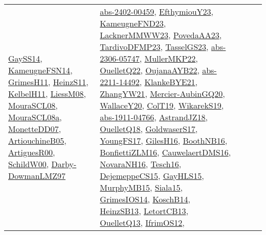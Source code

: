 {\begin{longtable}{lp{3cm}>{\raggedright}p{6cm}>{\raggedright}p{6cm}p{8cm}}
\href{papers/GaySS14.pdf}{GaySS14}\cite{GaySS14}, \href{articles/KameugneFSN14.pdf}{KameugneFSN14}\cite{KameugneFSN14}, \href{papers/GrimesH11.pdf}{GrimesH11}\cite{GrimesH11}, \href{papers/HeinzS11.pdf}{HeinzS11}\cite{HeinzS11}, \href{articles/KelbelH11.pdf}{KelbelH11}\cite{KelbelH11}, \href{articles/LiessM08.pdf}{LiessM08}\cite{LiessM08}, \href{papers/MouraSCL08.pdf}{MouraSCL08}\cite{MouraSCL08}, \href{papers/MouraSCL08a.pdf}{MouraSCL08a}\cite{MouraSCL08a}, \href{papers/MonetteDD07.pdf}{MonetteDD07}\cite{MonetteDD07}, \href{papers/ArtiouchineB05.pdf}{ArtiouchineB05}\cite{ArtiouchineB05}, \href{articles/ArtiguesR00.pdf}{ArtiguesR00}\cite{ArtiguesR00}, \href{articles/SchildW00.pdf}{SchildW00}\cite{SchildW00}, \href{articles/Darby-DowmanLMZ97.pdf}{Darby-DowmanLMZ97}\cite{Darby-DowmanLMZ97} & \href{articles/abs-2402-00459.pdf}{abs-2402-00459}\cite{abs-2402-00459}, \href{papers/EfthymiouY23.pdf}{EfthymiouY23}\cite{EfthymiouY23}, \href{papers/KameugneFND23.pdf}{KameugneFND23}\cite{KameugneFND23}, \href{articles/LacknerMMWW23.pdf}{LacknerMMWW23}\cite{LacknerMMWW23}, \href{papers/PovedaAA23.pdf}{PovedaAA23}\cite{PovedaAA23}, \href{papers/TardivoDFMP23.pdf}{TardivoDFMP23}\cite{TardivoDFMP23}, \href{papers/TasselGS23.pdf}{TasselGS23}\cite{TasselGS23}, \href{articles/abs-2306-05747.pdf}{abs-2306-05747}\cite{abs-2306-05747}, \href{articles/MullerMKP22.pdf}{MullerMKP22}\cite{MullerMKP22}, \href{papers/OuelletQ22.pdf}{OuelletQ22}\cite{OuelletQ22}, \href{papers/OujanaAYB22.pdf}{OujanaAYB22}\cite{OujanaAYB22}, \href{articles/abs-2211-14492.pdf}{abs-2211-14492}\cite{abs-2211-14492}, \href{papers/KlankeBYE21.pdf}{KlankeBYE21}\cite{KlankeBYE21}, \href{articles/ZhangYW21.pdf}{ZhangYW21}\cite{ZhangYW21}, \href{papers/Mercier-AubinGQ20.pdf}{Mercier-AubinGQ20}\cite{Mercier-AubinGQ20}, \href{articles/WallaceY20.pdf}{WallaceY20}\cite{WallaceY20}, \href{papers/ColT19.pdf}{ColT19}\cite{ColT19}, \href{articles/WikarekS19.pdf}{WikarekS19}\cite{WikarekS19}, \href{articles/abs-1911-04766.pdf}{abs-1911-04766}\cite{abs-1911-04766}, \href{papers/AstrandJZ18.pdf}{AstrandJZ18}\cite{AstrandJZ18}, \href{papers/OuelletQ18.pdf}{OuelletQ18}\cite{OuelletQ18}, \href{papers/GoldwaserS17.pdf}{GoldwaserS17}\cite{GoldwaserS17}, \href{papers/YoungFS17.pdf}{YoungFS17}\cite{YoungFS17}, \href{papers/GilesH16.pdf}{GilesH16}\cite{GilesH16}, \href{papers/BoothNB16.pdf}{BoothNB16}\cite{BoothNB16}, \href{papers/BonfiettiZLM16.pdf}{BonfiettiZLM16}\cite{BonfiettiZLM16}, \href{papers/CauwelaertDMS16.pdf}{CauwelaertDMS16}\cite{CauwelaertDMS16}, \href{articles/NovaraNH16.pdf}{NovaraNH16}\cite{NovaraNH16}, \href{papers/Tesch16.pdf}{Tesch16}\cite{Tesch16}, \href{papers/DejemeppeCS15.pdf}{DejemeppeCS15}\cite{DejemeppeCS15}, \href{papers/GayHLS15.pdf}{GayHLS15}\cite{GayHLS15}, \href{papers/MurphyMB15.pdf}{MurphyMB15}\cite{MurphyMB15}, \href{articles/Siala15.pdf}{Siala15}\cite{Siala15}, \href{articles/GrimesIOS14.pdf}{GrimesIOS14}\cite{GrimesIOS14}, \href{papers/KoschB14.pdf}{KoschB14}\cite{KoschB14}, \href{articles/HeinzSB13.pdf}{HeinzSB13}\cite{HeinzSB13}, \href{papers/LetortCB13.pdf}{LetortCB13}\cite{LetortCB13}, \href{papers/OuelletQ13.pdf}{OuelletQ13}\cite{OuelletQ13}, \href{papers/IfrimOS12.pdf}{IfrimOS12}\cite{IfrimOS12}, 
\end{longtable}}
